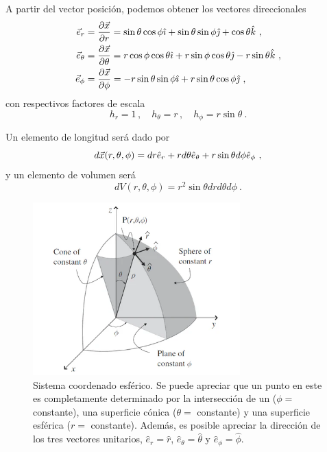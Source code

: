 A partir del vector posición, podemos obtener los vectores direccionales 
\begin{align}
    \vec{e}_r & = \frac{\partial \x}{\partial r} = \sin \theta \cos \phi \hat{\imath} + \sin \theta \sin \phi \hat{\jmath} + \cos \theta \hat{k} \ , \\
    \vec{e}_\theta & = \frac{\partial \x}{\partial \theta} = r \cos \phi \cos \theta \hat{\imath} + r \sin \phi \cos \theta \hat{\jmath} - r \sin \theta \hat{k} \ , \\
    \vec{e}_\phi & = \frac{\partial \x}{\partial \phi} = -r \sin \theta \sin \phi  \hat{\imath} + r \sin \theta \cos \phi \hat{\jmath} \ ,
\end{align}
con respectivos factores de escala 
\begin{equation}
    h_r = 1 \, , \quad h_\theta = r \, , \quad h_\phi = r \sin \theta \ .
\end{equation}

Un elemento de longitud será dado por 
\begin{equation}
    d\vec{x}(r, \theta, \phi) = dr \hat{e}_r + r d\theta \hat{e}_\theta + r \sin \theta d\phi \hat{e}_\phi \ ,
\end{equation}
y un elemento de volumen será
\begin{equation}
    dV(r, \theta, \phi) = r^2 \sin \theta dr d\theta d\phi \ .
\end{equation}

\begin{figure}[htbp]
    \centering
    \includegraphics[width=8cm]{Figuras/Lineas-coordenadas-esfericas.png}
    \caption{Sistema coordenado esférico. Se puede apreciar que un punto en este es completamente determinado por la intersección de un ($\phi = $ constante), una superficie cónica ($\theta = $ constante) y una superficie esférica ($r = $ constante). Además, es posible apreciar la dirección de los tres vectores unitarios, $\hat{e}_r = \hat{r}$, $\hat{e}_\theta = \hat{\theta}$ y $\hat{e}_\phi = \hat{\phi}$.}
\end{figure}

